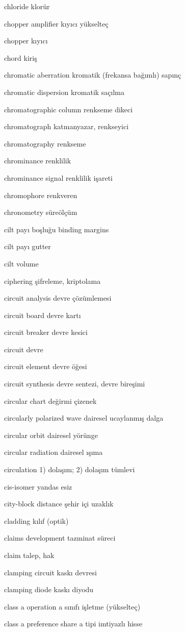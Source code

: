 \documentclass[12pt,fleqn]{article}\usepackage{../../common}
\begin{document}
chloride klorür

chopper amplifier kıyıcı yükselteç

chopper kıyıcı

chord kiriş

chromatic aberration kromatik (frekansa bağımlı) sapınç

chromatic dispersion kromatik saçılma

chromatographic column renkseme dikeci

chromatograph katmanyazar, renkseyici

chromatography renkseme

chrominance renklilik

chrominance signal renklilik işareti

chromophore renkveren

chronometry süreölçüm

cilt payı boşluğu binding margins

cilt payı gutter

cilt volume

ciphering şifreleme, kriptolama

circuit analysis devre çözümlemesi

circuit board devre kartı

circuit breaker devre kesici

circuit devre

circuit element devre öğesi

circuit synthesis devre sentezi, devre bireşimi

circular chart değirmi çizenek

circularly polarized wave dairesel ucaylanmış dalga

circular orbit dairesel yörünge

circular radiation dairesel ışıma

circulation 1) dolaşım; 2) dolaşım tümlevi

cis-isomer yandas esiz

city-block distance şehir içi uzaklık

cladding kılıf (optik)

claims development tazminat süreci

claim talep, hak

clamping circuit kaskı devresi

clamping diode kaskı diyodu

class a operation a sınıfı işletme (yükselteç)

class a preference share a tipi imtiyazlı hisse
\end{document}
